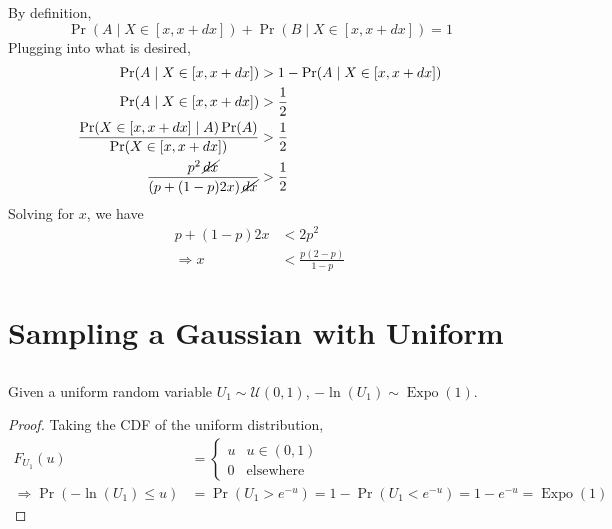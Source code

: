\documentclass{article}
\newcommand{\Expo}{\operatorname{Expo}}
\begin{document}
By definition,
\begin{equation}
    \Pr(A \mid X \in [x, x + dx]) + \Pr(B \mid X \in [x, x + dx]) = 1
\end{equation}
Plugging into what is desired,
\begin{align}
    \Pr(A \mid X \in [x, x + dx]) &> 1 - \Pr(A \mid X \in [x, x + dx]) \\
    \Pr(A \mid X \in [x, x + dx]) &> \frac{1}{2} \\
    \frac{\Pr(X \in [x, x + dx] \mid A) \Pr(A)}{\Pr(X \in [x, x + dx])} &> \frac{1}{2} \\
    \frac{p^2 \, \cancel{dx}}{(p + (1 - p) 2x) \, \cancel{dx}} &> \frac{1}{2}
\end{align}
Solving for \(x\), we have
\begin{align}
    p + (1 - p) 2x &< 2p^2 \\
    \Rightarrow x &< \frac{p(2 - p)}{1 - p}
\end{align}

\section{Sampling a Gaussian with Uniform}

\subsection{}

\begin{theorem}
    Given a uniform random variable \(U_1 \sim \mathcal{U}(0, 1)\), \(-\ln(U_1) \sim \Expo(1)\).
\end{theorem}
\begin{proof}
    Taking the CDF of the uniform distribution,
    \begin{align}
        F_{U_1}(u) &=
        \begin{cases}
            u & u \in (0, 1) \\
            0 & \text{elsewhere}
        \end{cases} \\
        \Rightarrow \Pr(-\ln(U_1) \leqslant u) &= \Pr(U_1 > e^{-u}) = 1 - \Pr(U_1 < e^{-u}) = 1 - e^{-u} = \Expo(1)
    \end{align}
\end{proof}

\subsection{}
\end{document}
